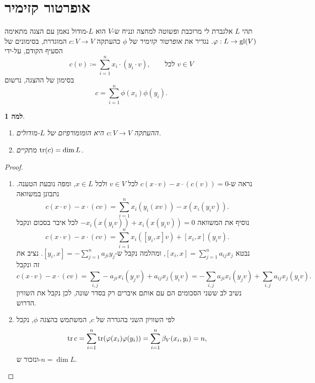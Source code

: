 \documentclass{report}
\theoremstyle{break}
\newtheorem{lemma}[lemma]{למה}
\theoremstyle{MyNonumberbreak}
\newtheorem{proof}{הוכחה}
\begin{document}
\section{אופרטור קזימיר}
תהי $L$ אלגברת לי מרוכבת ופשוטה למחצה ונניח ש-$V$ הוא $L$-מודול נאמן עם הצגה מתאימה $\varphi : L \to \operatorname{gl}(V)$. נגדיר את \textit{אופרטור קזימיר} של $\phi$ כהעתקה $c : V \to V$ המוגדרת, בסימונים של הסעיף הקודם, על-ידי
\[ c(v) \coloneqq \sum_{i=1}^n x_i \cdot (y_i \cdot v), \qquad \text{לכל $v \in V$} \]
בסימון של ההצגה, נרשום
\[ c = \sum_{i=1}^n \phi(x_i)\phi(y_i). \]
\begin{lemma} \label{lemma:casimir}
	\begin{enumerate}[label=(\alph*)]
		\item 
		ההעתקה $c : V \to V$ היא הומומורפיזם של $L$-מודולים.
		\item
		מתקיים $\operatorname{tr}(c) = \dim L$.
	\end{enumerate}
\end{lemma}
\begin{proof}
	\begin{enumerate}[label=(\alph*)]
		\item 
		נראה ש-$c(x \cdot v) - x \cdot (c(v)) = 0$ לכל $v \in V$ ולכל $x \in L$, ומפה נובעת הטענה. נתבונן במשוואה
		\[ c(x \cdot v) - x \cdot (cv) = \sum_{i=1}^n x_i(y_i(xv)) - x(x_i(y_iv)). \]
		נוסיף את המשוואה $-x_i(x(y_iv))+x_i(x(y_iv))=0$ לכל איבר בסכום ונקבל
		\[ c(x \cdot v) - x \cdot (cv) = \sum_{i=1}^n x_i([y_i, x]v) + [x_i, x](y_iv). \]
		נבטא $[x_i, x] = \sum_{j=1}^n a_{ij}x_j$, ומהלמה נקבל ש-$[y_i, x] = -\sum_{j=1}^n a_{ji}y_j$. נציב את זה ונקבל
		\[ c(x \cdot v) - x \cdot (cv) = \sum_{i,j} -a_{ji}x_i(y_jv) + a_{ij}x_j(y_iv) = -\sum_{i,j} a_{ji}x_i(y_jv) + \sum_{i,j}a_{ij}x_j(y_iv). \]
		נשיב לב ששני הסכומים הם עם אותם איברים רק בסדר שונה, לכן נקבל את השוויון הדרוש.
		\item
		לפי השוויון השני בהגדרה של $c$, המשתמש בהצגה $\phi$, נקבל
		\[ \operatorname{tr} c = \sum_{i=1}^n \operatorname{tr}(\varphi(x_i) \varphi(y_i)) = \sum_{i=1}^n \beta_V(x_i, y_i) = n, \]
		ונזכור ש-$n = \dim L$.
	\end{enumerate}
\end{proof}
\end{document}
